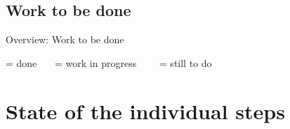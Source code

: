 \subsection{Work to be done}
\begin{frame}{Overview: Work to be done}


  \tableofcontents[sectionstyle=hide,subsectionstyle=show,sections=2-]

  \bigskip \bigskip \small
  \done = done \ \ \ \inprogress = work in progress \ \ \ \tobedone\ = still to do
\end{frame}

\section{State of the individual steps}
